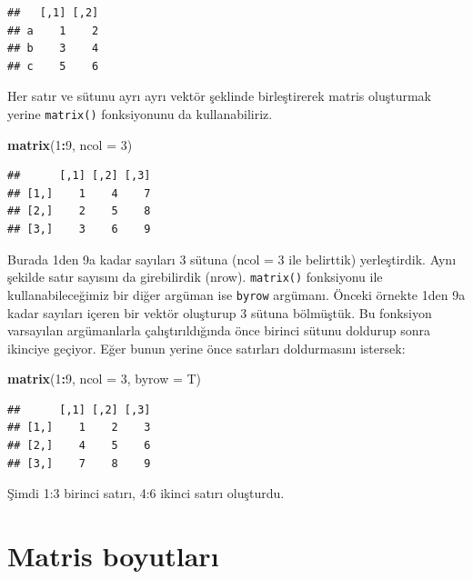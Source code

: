 \documentclass[
]{book}
\newenvironment{Shaded}{\begin{snugshade}}{\end{snugshade}}
\newcommand{\DataTypeTok}[1]{\textcolor[rgb]{0.13,0.29,0.53}{#1}}
\newcommand{\DecValTok}[1]{\textcolor[rgb]{0.00,0.00,0.81}{#1}}
\newcommand{\KeywordTok}[1]{\textcolor[rgb]{0.13,0.29,0.53}{\textbf{#1}}}
\newcommand{\NormalTok}[1]{#1}
\newcommand{\OperatorTok}[1]{\textcolor[rgb]{0.81,0.36,0.00}{\textbf{#1}}}
\begin{document}
\begin{verbatim}
##   [,1] [,2]
## a    1    2
## b    3    4
## c    5    6
\end{verbatim}

Her satır ve sütunu ayrı ayrı vektör şeklinde birleştirerek matris oluşturmak yerine \texttt{matrix()} fonksiyonunu da kullanabiliriz.

\begin{Shaded}
\begin{Highlighting}[]
\KeywordTok{matrix}\NormalTok{(}\DecValTok{1}\OperatorTok{:}\DecValTok{9}\NormalTok{, }\DataTypeTok{ncol =} \DecValTok{3}\NormalTok{)}
\end{Highlighting}
\end{Shaded}

\begin{verbatim}
##      [,1] [,2] [,3]
## [1,]    1    4    7
## [2,]    2    5    8
## [3,]    3    6    9
\end{verbatim}

Burada 1den 9a kadar sayıları 3 sütuna (ncol = 3 ile belirttik) yerleştirdik. Aynı şekilde satır sayısını da girebilirdik (nrow). \texttt{matrix()} fonksiyonu ile kullanabileceğimiz bir diğer argüman ise \texttt{byrow} argümanı. Önceki örnekte 1den 9a kadar sayıları içeren bir vektör oluşturup 3 sütuna bölmüştük. Bu fonksiyon varsayılan argümanlarla çalıştırıldığında önce birinci sütunu doldurup sonra ikinciye geçiyor. Eğer bunun yerine önce satırları doldurmasını istersek:

\begin{Shaded}
\begin{Highlighting}[]
\KeywordTok{matrix}\NormalTok{(}\DecValTok{1}\OperatorTok{:}\DecValTok{9}\NormalTok{, }\DataTypeTok{ncol =} \DecValTok{3}\NormalTok{, }\DataTypeTok{byrow =}\NormalTok{ T)}
\end{Highlighting}
\end{Shaded}

\begin{verbatim}
##      [,1] [,2] [,3]
## [1,]    1    2    3
## [2,]    4    5    6
## [3,]    7    8    9
\end{verbatim}

Şimdi 1:3 birinci satırı, 4:6 ikinci satırı oluşturdu.

\hypertarget{matris-boyutlarux131}{%
\section{Matris boyutları}\label{matris-boyutlarux131}}
\end{document}
